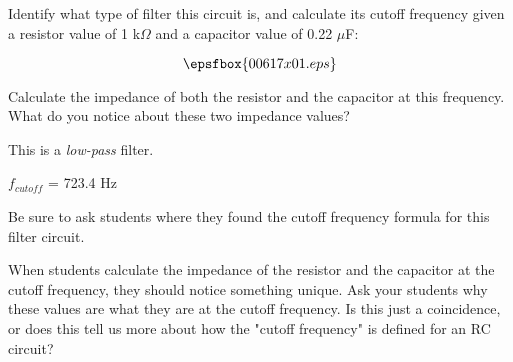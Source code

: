 

Identify what type of filter this circuit is, and calculate its cutoff frequency given a resistor value of 1 k$\Omega$ and a capacitor value of 0.22 $\mu$F:

$$\epsfbox{00617x01.eps}$$

Calculate the impedance of both the resistor and the capacitor at this frequency.  What do you notice about these two impedance values?







This is a {\it low-pass} filter.

\vskip 10pt

$f_{cutoff}$ = 723.4 Hz







Be sure to ask students where they found the cutoff frequency formula for this filter circuit.

When students calculate the impedance of the resistor and the capacitor at the cutoff frequency, they should notice something unique.  Ask your students why these values are what they are at the cutoff frequency.  Is this just a coincidence, or does this tell us more about how the "cutoff frequency" is defined for an RC circuit?





